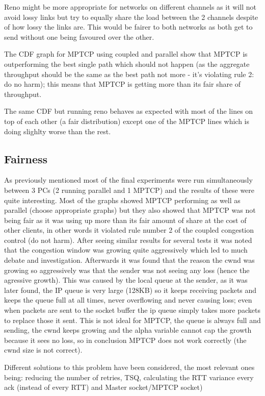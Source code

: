 \documentclass[12pt,a4paper]{article}
\begin{document}
Reno might be more appropriate for networks on different channels as it will not
avoid lossy links but try to equally share the load between the 2 channels
despite of how lossy the links are. This would be fairer to both networks as
both get to send without one being favoured over the other.

The CDF graph for MPTCP using coupled and parallel show that MPTCP is
outperforming the best single path which should not happen (as the aggregate
throughput should be the same as the best path not more - it's violating rule 2:
do no harm); this means that MPTCP is getting more than its fair share of
throughput.

The same CDF but running reno behaves as expected with most of the lines on top
of each other (a fair distribution) except one of the MPTCP lines which is doing
slighlty worse than the rest.

\subsection{Fairness}
As previously mentioned most of the final experiments were run simultaneously
between 3 PCs (2 running parallel and 1 MPTCP) and the results of these were
quite interesting. Most of the graphs showed MPTCP performing as well as
parallel (choose appropriate graphs) but they also showed that MPTCP was not
being fair as it was using up more than its fair amount of share at the cost of
other clients, in other words it violated rule number 2 of the coupled
congestion control (do not harm). After seeing similar results for several tests
it was noted that the congestion window was growing quite aggressively which led
to much debate and investigation. Afterwards it was found that the reason the
cwnd was growing so aggressively was that the sender was not seeing any loss
(hence the agressive growth). This was caused by the local queue at the sender,
as it was later found, the IP queue is very large (128KB) so it keeps receiving
packets and keeps the queue full at all times, never overflowing and never
causing loss; even when packets are sent to the socket buffer the ip queue
simply takes more packets to replace those it sent. This is not ideal for MPTCP,
the queue is always full and sending, the cwnd keeps growing and the alpha
variable cannot cap the growth because it sees no loss, so in conclusion MPTCP
does not work correctly (the cwnd size is not correct).

Different solutions to this problem have been considered, the most relevant ones
being: reducing the number of retries, TSQ, calculating the RTT variance every
ack (instead of every RTT) and Master socket/MPTCP socket)
\end{document}
